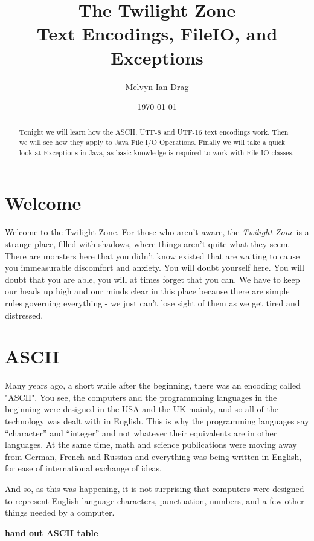 \documentclass[12pt]{article}
\title{\textbf{The Twilight Zone} \\
\Large Text Encodings, FileIO, and Exceptions }
\author{
	Melvyn Ian Drag
}
\date{\today}
\begin{document}
\maketitle

\begin{abstract}
Tonight we will learn how the ASCII, UTF-8 and UTF-16 text encodings work. Then we will see how they apply to Java File I/O Operations. Finally we will take a quick look at Exceptions in Java, as basic knowledge is required to work with File IO classes.
\end{abstract}

\section{Welcome}
Welcome to the Twilight Zone. For those who aren't aware, the \textit{Twilight Zone} is a strange place, filled with shadows, where things aren't quite what they seem. There are monsters here that you didn't know existed that are waiting to cause you immeasurable discomfort and anxiety. You will doubt yourself here. You will doubt that you are able, you will at times forget that you can. We have to keep our heads up high and our minds clear in this place because there are simple rules governing everything - we just can't lose sight of them as we get tired and distressed.

\section{ASCII}
Many years ago, a short while after the beginning, there was an encoding called "ASCII". You see, the computers and the programmning languages in the beginning were designed in the USA and the UK mainly, and so all of the technology was dealt with in English. This is why the programming languages say ``character'' and ``integer'' and not whatever their equivalents are in other languages. At the same time, math and science publications were moving away from German, French and Russian and everything was being written in English, for ease of international exchange of ideas. 

And so, as this was happening, it is not surprising that computers were designed to represent English language characters, punctuation, numbers, and a few other things needed by a computer. 

\begin{center}
\textbf{hand out ASCII table}
\end{center}
\end{document}
